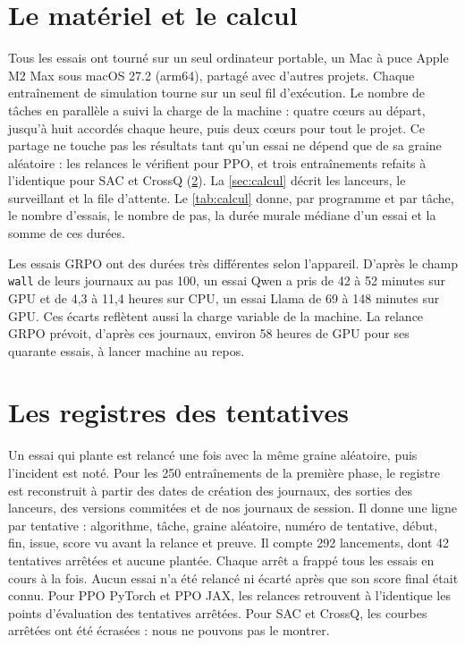 \section{Le matériel et le calcul}
\label{sec:log-calcul}

Tous les essais ont tourné sur un seul ordinateur portable, un Mac à puce Apple M2 Max sous macOS
27.2 (arm64), partagé avec d'autres projets. Chaque entraînement de simulation tourne sur un seul
fil d'exécution. Le nombre de tâches en parallèle a suivi la charge de la machine : quatre cœurs au
départ, jusqu'à huit accordés chaque heure, puis deux cœurs pour tout le projet. Ce partage ne touche
pas les résultats tant qu'un essai ne dépend que de sa graine aléatoire : les relances le vérifient pour PPO, et trois entraînements refaits à l'identique pour SAC et CrossQ
(\cref{sec:registres}). La \cref{sec:calcul} décrit les lanceurs,
le surveillant et la file d'attente. Le \cref{tab:calcul} donne, par programme et par tâche, le
nombre d'essais, le nombre de pas, la durée murale médiane d'un essai et la somme de ces durées.

Les essais GRPO ont des durées très différentes selon l'appareil. D'après le champ \texttt{wall} de
leurs journaux au pas 100, un essai Qwen a pris de 42 à 52 minutes sur GPU et de 4,3 à 11,4 heures
sur CPU, un essai Llama de 69 à 148 minutes sur GPU. Ces écarts reflètent aussi la charge variable
de la machine. La relance GRPO prévoit, d'après ces journaux, environ 58 heures de GPU pour ses
quarante essais, à lancer machine au repos.

\section{Les registres des tentatives}
\label{sec:registres}

Un essai qui plante est relancé une fois avec la même graine aléatoire, puis l'incident est noté.
Pour les 250 entraînements de la première phase, le registre
 est reconstruit à partir des dates de création des
journaux, des sorties des lanceurs, des versions commitées et de nos journaux de session. Il donne
une ligne par tentative : algorithme, tâche, graine aléatoire, numéro de tentative, début, fin,
issue, score vu avant la relance et preuve. Il compte 292 lancements, dont 42 tentatives arrêtées et
aucune plantée. Chaque arrêt a frappé tous les essais en cours à la fois. Aucun essai n'a été relancé
ni écarté après que son score final était connu. Pour PPO PyTorch et PPO JAX, les relances
retrouvent à l'identique les points d'évaluation des tentatives arrêtées. Pour SAC et CrossQ, les courbes arrêtées ont été écrasées : nous ne pouvons pas le montrer.

